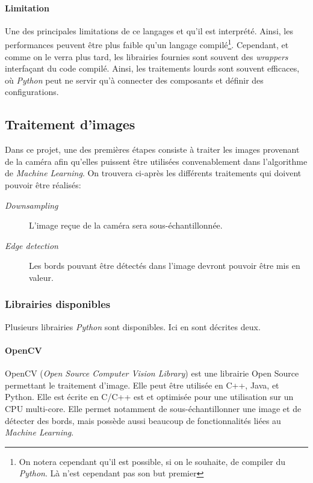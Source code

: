 \paragraph{Limitation}
Une des principales limitations de ce langages et qu'il est interprété. Ainsi, les performances peuvent être plus faible qu'un langage compilé\footnote{ On notera cependant qu'il est possible, si on le souhaite, de compiler du \textit{Python}. Là n'est cependant pas son but premier}. Cependant, et comme on le verra plus tard, les librairies fournies sont souvent des \textit{wrappers} interfaçant du code compilé. Ainsi, les traitements lourds sont souvent efficaces, où \textit{Python} peut ne servir qu'à connecter des composants et définir des configurations. 

\subsection{Traitement d'images}
Dans ce projet, une des premières étapes consiste à traiter les images provenant de la caméra afin qu'elles puissent être utilisées convenablement dans l'algorithme de \textit{Machine Learning}. On trouvera ci-après les différents traitements qui doivent pouvoir être réalisés:
\begin{description}
    \item[\textit{Downsampling}] L'image reçue de la caméra sera sous-échantillonnée.
    \item[\textit{Edge detection}] Les bords pouvant être détectés dans l'image devront pouvoir être mis en valeur. 
\end{description}

\subsubsection{Librairies disponibles}
Plusieurs librairies \textit{Python} sont disponibles. Ici en sont décrites deux.

\paragraph{OpenCV}
OpenCV\autocite{lib:opencv} (\textit{Open Source Computer Vision Library}) est une librairie Open Source permettant le traitement d'image. Elle peut être utilisée en C++, Java, et Python. Elle est écrite en C/C++ est et optimisée pour une utilisation sur un CPU multi-core. Elle permet notamment de sous-échantillonner une image et de détecter des bords, mais possède aussi beaucoup de fonctionnalités liées au \textit{Machine Learning}.


